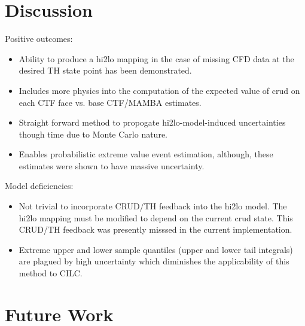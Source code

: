 
\section{Discussion}

Positive outcomes:

\begin{itemize}
	\item  Ability to produce a hi2lo mapping in the case of missing CFD data at the desired TH state point has been demonstrated.
	\item  Includes more physics into the computation of the expected value of crud on each CTF face vs. base CTF/MAMBA estimates.
	\item  Straight forward method to propogate hi2lo-model-induced uncertainties though time due to Monte Carlo nature.
	\item  Enables probabilistic extreme value event estimation, although, these estimates were shown to have massive uncertainty.
\end{itemize}

\noindent Model deficiencies:  

\begin{itemize}
	\item  Not trivial to incorporate CRUD/TH feedback into the hi2lo model.  The hi2lo mapping must be modified to depend on the current crud state.  This CRUD/TH feedback was presently misssed in the current implementation.
	\item  Extreme upper and lower sample quantiles (upper and lower tail integrals) are plagued by high uncertainty which diminishes the applicability of this method to CILC.  
\end{itemize}

\section{Future Work}

